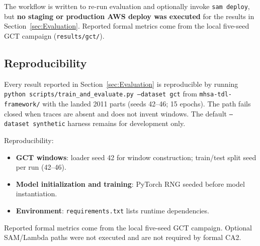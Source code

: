 The workflow is written to re-run evaluation and optionally invoke \texttt{sam deploy}, but \textbf{no staging or production AWS deploy was executed} for the results in Section~\ref{sec:Evaluation}. Reported formal metrics come from the local five-seed GCT campaign (\texttt{results/gct/}).

\subsection{Reproducibility}
\label{subsec:reproducibility}

Every result reported in Section~\ref{sec:Evaluation} is reproducible by running \texttt{python scripts/train\_and\_evaluate.py --dataset gct} from \texttt{mhsa-tdl-framework/} with the landed 2011 parts (seeds 42--46; 15 epochs). The path fails closed when traces are absent and does not invent windows. The default \texttt{--dataset synthetic} harness remains for development only.

Reproducibility:
\begin{itemize}
  \item \textbf{GCT windows}: loader seed 42 for window construction; train/test split seed per run (42--46).
  \item \textbf{Model initialization and training}: PyTorch RNG seeded before model instantiation.
  \item \textbf{Environment}: \texttt{requirements.txt} lists runtime dependencies.
\end{itemize}

Reported formal metrics come from the local five-seed GCT campaign. Optional SAM/Lambda paths were not executed and are not required by formal CA2.

